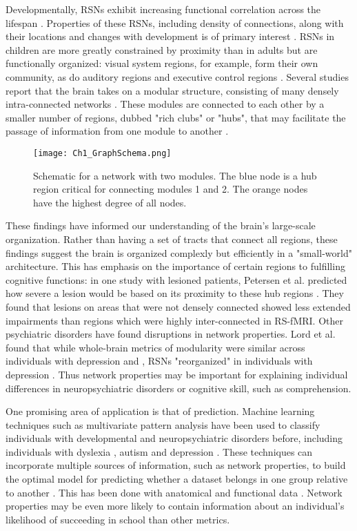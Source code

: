Developmentally, RSNs exhibit increasing functional correlation across the lifespan \cite{Kesler2013, Uddin2010}. Properties of these RSNs, including density of connections, along with their locations and changes with development is of primary interest  \cite{Cole2014, Dosenbach2007, Fair2009}. RSNs in children are more greatly constrained by proximity than in adults but are functionally organized: visual system regions, for example, form their own community, as do auditory regions and executive control regions \cite{Seeley2007}. Several studies report that the brain takes on a modular structure, consisting of many densely intra-connected networks \cite{Bullmore2009, Fair2009, Supekar2009, Dosenbach2007}. These modules are connected to each other by a smaller number of regions, dubbed "rich clubs" or "hubs", that may facilitate the passage of information from one module to another \cite{Power2013, Bullmore2012}. 

\begin{figure}[t]
    \centering
    \texttt{[image: Ch1\_GraphSchema.png]}
    \caption[Schematic for a network with two modules.]{Schematic for a network with two modules. The blue node is a hub region critical for connecting modules 1 and 2. The orange nodes have the highest degree of all nodes.}
\end{figure}

These findings have informed our understanding of the brain's large-scale organization. Rather than having a set of tracts that connect all regions, these findings suggest the brain is organized complexly but efficiently in a "small-world" architecture. This has emphasis on the importance of certain regions to fulfilling cognitive functions: in one study with lesioned patients, Petersen et al. predicted how severe a lesion would be based on its proximity to these hub regions \cite{Warren2014}. They found that lesions on areas that were not densely connected showed less extended impairments than regions which were highly inter-connected in RS-fMRI. Other psychiatric disorders have found disruptions in network properties. Lord et al. found that while whole-brain metrics of modularity were similar across individuals with depression and , RSNs "reorganized" in individuals with depression \cite{Lord2012}. Thus network properties may be important for explaining individual differences in neuropsychiatric disorders or cognitive skill, such as comprehension. 

One promising area of application is that of prediction. Machine learning techniques such as multivariate pattern analysis have been used to classify individuals with developmental and neuropsychiatric disorders before, including individuals with dyslexia \cite{Ecker2010, Hoeft2011, Wee2014, Hoeft2007, Ingalhalikar2014}, autism and depression \cite{Lord2012}.  These techniques can incorporate multiple sources of information, such as network properties, to build the optimal model for predicting whether a dataset belongs in one group relative to another \cite{Pereira2009}. This has been done with anatomical and functional data \cite{Hoeft2007, Hoeft2007b}. Network properties may be even more likely to contain information about an individual's likelihood of succeeding in school than other metrics.

